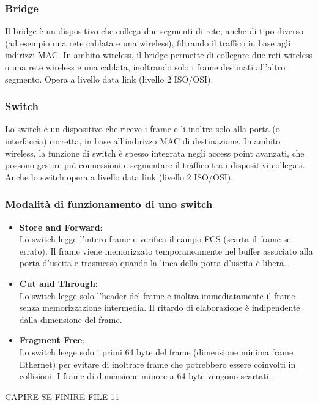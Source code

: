 \subsubsection{Bridge}
Il bridge è un dispositivo che collega due segmenti di rete, anche di tipo diverso (ad esempio una rete cablata e una wireless), filtrando il traffico in base agli indirizzi MAC. In ambito wireless, il bridge permette di collegare due reti wireless o una rete wireless e una cablata, inoltrando solo i frame destinati all'altro segmento. Opera a livello data link (livello 2 ISO/OSI).

\subsubsection{Switch}
Lo switch è un dispositivo che riceve i frame e li inoltra solo alla porta (o interfaccia) corretta, in base all'indirizzo MAC di destinazione. In ambito wireless, la funzione di switch è spesso integrata negli access point avanzati, che possono gestire più connessioni e segmentare il traffico tra i dispositivi collegati. Anche lo switch opera a livello data link (livello 2 ISO/OSI).
\subsubsection{Modalità di funzionamento di uno switch}

\begin{itemize}
    \item \textbf{Store and Forward}:\\
    Lo switch legge l’intero frame e verifica il campo FCS (scarta il frame se errato). Il frame viene memorizzato temporaneamente nel buffer associato alla porta d’uscita e trasmesso quando la linea della porta d’uscita è libera.
    \item \textbf{Cut and Through}:\\
    Lo switch legge solo l’header del frame e inoltra immediatamente il frame senza memorizzazione intermedia. Il ritardo di elaborazione è indipendente dalla dimensione del frame.
    \item \textbf{Fragment Free}:\\
    Lo switch legge solo i primi 64 byte del frame (dimensione minima frame Ethernet) per evitare di inoltrare frame che potrebbero essere coinvolti in collisioni. I frame di dimensione minore a 64 byte vengono scartati.
\end{itemize}
CAPIRE SE FINIRE FILE 11